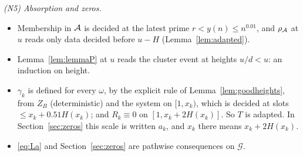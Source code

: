 \emph{(N5) Absorption and zeros.}
\begin{itemize}
\item Membership in $\mathcal{A}$ is decided at the latest prime $r<y(n)\le n^{0.01}$, and $\rho_{\mathcal{A}}$ at $u$ reads only data decided before
$u-H$ (Lemma~\ref{lem:adapted}).
\item Lemma~\ref{lem:lemmaP} at $u$ reads the cluster event at heights $u/d<u$: an induction on height.
\item $\gamma_k$ is defined for every $\omega$, by the explicit rule of Lemma~\ref{lem:goodheights}, from $Z_B$ (deterministic) and
the system on $[1,x_k)$, which is decided at slots $\le x_k+0.51H(x_k)$; and $R_k\equiv0$ on $[1,x_k+2H(x_k)]$. So $T$ is adapted.
In Section~\ref{sec:zeros} this scale is written $a_k$, and $x_k$ there means $x_k+2H(x_k)$.
\item \eqref{eq:La} and Section~\ref{sec:zeros} are pathwise consequences on $\mathcal G$.
\end{itemize}
